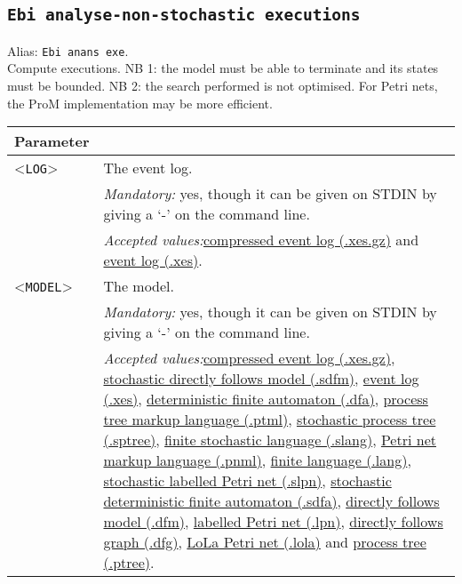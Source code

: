 {\subsection{\texttt{Ebi analyse-non-stochastic executions}}
\label{command:Ebi analyse-non-stochastic executions}
Alias: \texttt{Ebi anans exe}.\\
Compute executions.
NB 1: the model must be able to terminate and its states must be bounded.
NB 2: the search performed is not optimised. For Petri nets, the ProM implementation may be more efficient.\\
\begin{tabularx}{\linewidth}{lX}
\toprule
Parameter \\\midrule
<\texttt{LOG}>&The event log.\\
&\textit{Mandatory:} \quad yes, though it can be given on STDIN by giving a `-' on the command line.\\
&\textit{Accepted values:}\quad \hyperref[filehandler:compressed event log]{compressed event log (.xes.gz)} and \hyperref[filehandler:event log]{event log (.xes)}.\\
<\texttt{MODEL}>&The model.\\
&\textit{Mandatory:} \quad yes, though it can be given on STDIN by giving a `-' on the command line.\\
&\textit{Accepted values:}\quad \hyperref[filehandler:compressed event log]{compressed event log (.xes.gz)}, \hyperref[filehandler:stochastic directly follows model]{stochastic directly follows model (.sdfm)}, \hyperref[filehandler:event log]{event log (.xes)}, \hyperref[filehandler:deterministic finite automaton]{deterministic finite automaton (.dfa)}, \hyperref[filehandler:process tree markup language]{process tree markup language (.ptml)}, \hyperref[filehandler:stochastic process tree]{stochastic process tree (.sptree)}, \hyperref[filehandler:finite stochastic language]{finite stochastic language (.slang)}, \hyperref[filehandler:Petri net markup language]{Petri net markup language (.pnml)}, \hyperref[filehandler:finite language]{finite language (.lang)}, \hyperref[filehandler:stochastic labelled Petri net]{stochastic labelled Petri net (.slpn)}, \hyperref[filehandler:stochastic deterministic finite automaton]{stochastic deterministic finite automaton (.sdfa)}, \hyperref[filehandler:directly follows model]{directly follows model (.dfm)}, \hyperref[filehandler:labelled Petri net]{labelled Petri net (.lpn)}, \hyperref[filehandler:directly follows graph]{directly follows graph (.dfg)}, \hyperref[filehandler:LoLa Petri net]{LoLa Petri net (.lola)} and \hyperref[filehandler:process tree]{process tree (.ptree)}.\\

\end{tabularx}}
